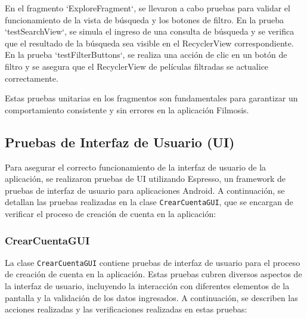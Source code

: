 \documentclass{article}
\begin{document}
En el fragmento `ExploreFragment`, se llevaron a cabo pruebas para validar el funcionamiento de la vista de búsqueda y los botones de filtro. En la prueba `testSearchView`, se simula el ingreso de una consulta de búsqueda y se verifica que el resultado de la búsqueda sea visible en el RecyclerView correspondiente. En la prueba `testFilterButtons`, se realiza una acción de clic en un botón de filtro y se asegura que el RecyclerView de películas filtradas se actualice correctamente.

Estas pruebas unitarias en los fragmentos son fundamentales para garantizar un comportamiento consistente y sin errores en la aplicación Filmosis.

\subsection{Pruebas de Interfaz de Usuario (UI)}

Para asegurar el correcto funcionamiento de la interfaz de usuario de la aplicación, se realizaron pruebas de UI utilizando Espresso, un framework de pruebas de interfaz de usuario para aplicaciones Android. A continuación, se detallan las pruebas realizadas en la clase \texttt{CrearCuentaGUI}, que se encargan de verificar el proceso de creación de cuenta en la aplicación:

\subsubsection{CrearCuentaGUI}

La clase \texttt{CrearCuentaGUI} contiene pruebas de interfaz de usuario para el proceso de creación de cuenta en la aplicación. Estas pruebas cubren diversos aspectos de la interfaz de usuario, incluyendo la interacción con diferentes elementos de la pantalla y la validación de los datos ingresados. A continuación, se describen las acciones realizadas y las verificaciones realizadas en estas pruebas:
\end{document}
